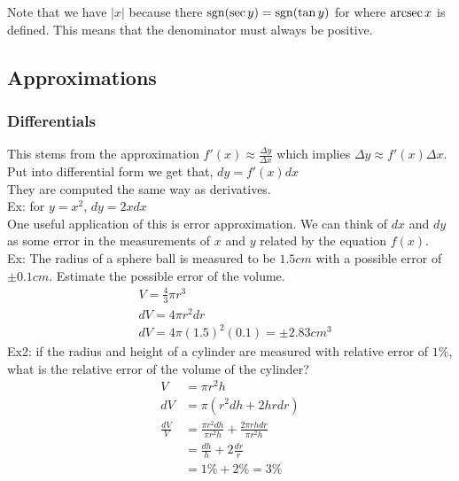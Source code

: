 \documentclass[11pt, fleqn]{article}
\begin{document}
Note that we have $|x|$ because there $\operatorname{sgn}(\sec y)=\operatorname{sgn}(\tan y)$ for where $\operatorname{arcsec} x$ is defined. This means that the denominator must always be positive.










\subsection{Approximations}

\subsubsection{Differentials}
This stems from the approximation $f'(x)\approx \frac{\Delta y}{\Delta x}$ which implies $\Delta y\approx f'(x)\Delta x$. Put into differential form we get that, $dy=f'(x)dx$\\
They are computed the same way as derivatives.\\
Ex: for $y=x^2$, $dy=2xdx$\\
One useful application of this is error approximation. We can think of $dx$ and $dy$ as some error in the measurements of $x$ and $y$ related by the equation $f(x)$.\\
Ex: The radius of a sphere ball is measured to be $1.5cm$ with a possible error of $\pm 0.1cm$. Estimate the possible error of the volume.
\begin{align*}
    &V=\frac{4}{3}\pi r^3\\
    &dV=4\pi r^2dr\\
    &dV=4\pi(1.5)^2(0.1)=\pm2.83cm^3
\end{align*}
Ex2: if the radius and height of a cylinder are measured with relative error of $1\%$, what is the relative error of the volume of the cylinder?
\begin{align*}
    V&=\pi r^2h\\
    dV&=\pi(r^2dh+2hrdr)\\
    \frac{dV}{V}&=\frac{\pi r^2dh}{\pi r^2h}+\frac{2\pi rhdr}{\pi r^2h}\\
    &=\frac{dh}{h}+2\frac{dr}{r}\\
    &=1\%+2\%=3\%
\end{align*}
\end{document}
